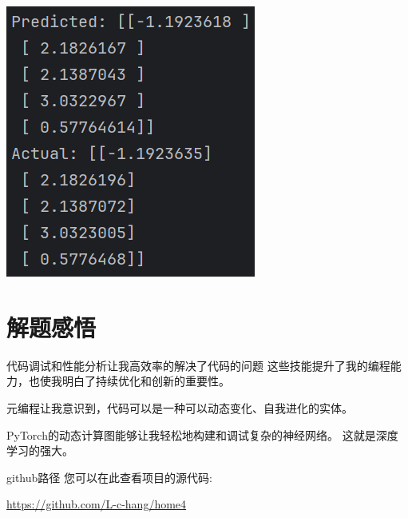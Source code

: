 \documentclass{article}
\begin{document}
\noindent
\begin{minipage}{\linewidth}
 \centering
  \includegraphics[width=0.5\linewidth]{py3.png}
  \label{fig:example}
\end{minipage}

\section{解题感悟}
代码调试和性能分析让我高效率的解决了代码的问题
这些技能提升了我的编程能力，也使我明白了持续优化和创新的重要性。

元编程让我意识到，代码可以是一种可以动态变化、自我进化的实体。

PyTorch的动态计算图能够让我轻松地构建和调试复杂的神经网络。
这就是深度学习的强大。

github路径
您可以在此查看项目的源代码: 

\url{https://github.com/L-c-hang/home4}
\end{document}
